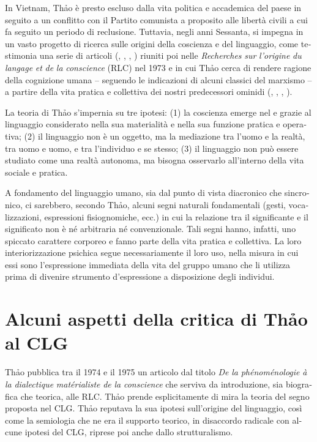 \documentclass[output=paper]{../langscibook}
\begin{document}
\begin{otherlanguage}{italian}
In Vietnam, Thảo è presto escluso dalla vita politica e accademica del paese in seguito a un conflitto con il Partito comunista a proposito alle libertà civili a cui fa seguito un periodo di reclusione. Tuttavia, negli anni Sessanta, si impegna in un vasto progetto di ricerca sulle origini della coscienza e del linguaggio, come testimonia una serie di articoli (\citealt{thao_mouvement_1966}, \citeyear{thao_du_1969}, \citeyear{thao_du_1969-1}, \citeyear{thao_du_1970}) riuniti poi nelle \textit{Recherches} \textit{sur} \textit{l’origine} \textit{du} \textit{langage} \textit{et} \textit{de} \textit{la} \textit{conscience} (RLC) nel 1973 e in cui Thảo cerca di rendere ragione della cognizione umana – seguendo le indicazioni di alcuni classici del marxismo – a partire della vita pratica e collettiva dei nostri predecessori ominidi (\citealt{federici_viet_1970}, \citealt{caveing_recherche_1974}, \citealt{haudricourt_tran_1974}, \citealt{frederic_tran_1974}).

La teoria di Thảo s’impernia su tre ipotesi: (1) la coscienza emerge nel e grazie al linguaggio considerato nella sua materialità e nella sua funzione pratica e operativa; (2) il linguaggio non è un oggetto, ma la mediazione tra l’uomo e la realtà, tra uomo e uomo, e tra l’individuo e se stesso; (3) il linguaggio non può essere studiato come una realtà autonoma, ma bisogna osservarlo all’interno della vita sociale e pratica.

A fondamento del linguaggio umano, sia dal punto di vista diacronico che sincronico, ci sarebbero, secondo Thảo, alcuni segni naturali fondamentali (gesti, vocalizzazioni, espressioni fisiognomiche, ecc.) in cui la relazione tra il significante e il significato non è né arbitraria né convenzionale. Tali segni hanno, infatti, uno spiccato carattere corporeo e fanno parte della vita pratica e collettiva. La loro interiorizzazione psichica segue necessariamente il loro uso, nella misura in cui essi sono l’espressione immediata della vita del gruppo umano che li utilizza prima di divenire strumento d’espressione a disposizione degli individui.

\section{Alcuni aspetti della critica di Thảo al CLG}

Thảo pubblica tra il 1974 e il 1975 un articolo dal titolo \textit{De} \textit{la} \textit{phénoménologie} \textit{à} \textit{la} \textit{dialectique} \textit{matérialiste} \textit{de} \textit{la} \textit{conscience} che serviva da introduzione, sia biografica che teorica, alle RLC. Th\textlatin{ả}o prende esplicitamente di mira la teoria del segno proposta nel CLG. Th\textlatin{ả}o reputava la sua ipotesi sull’origine del linguaggio, così come la semiologia che ne era il supporto teorico, in disaccordo radicale con alcune ipotesi del CLG, riprese poi anche dallo strutturalismo.


\end{otherlanguage}
\end{document}

